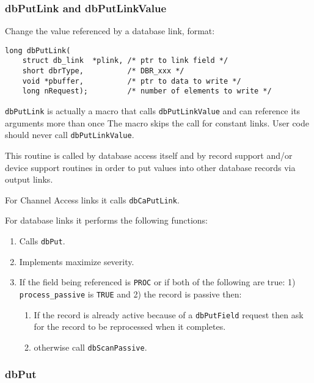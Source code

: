\subsubsection{dbPutLink and dbPutLinkValue}

Change the value referenced by a database link, format:

\begin{verbatim}long dbPutLink(
    struct db_link  *plink, /* ptr to link field */
    short dbrType,          /* DBR_xxx */
    void *pbuffer,          /* ptr to data to write */
    long nRequest);         /* number of elements to write */
\end{verbatim}\verb|dbPutLink| is actually a macro that calls \verb|dbPutLinkValue| and can reference its arguments more than once The 
macro skips the call for constant links. User code should never call \verb|dbPutLinkValue|.

This routine is called by database access itself and by record support and/or device support routines in order to put values 
into other database records via output links.

For Channel Access links it calls \verb|dbCaPutLink|.

For database links it performs the following functions:

\begin{enumerate}\item Calls \verb|dbPut|.

\item Implements maximize severity.

\item If the field being referenced is \verb|PROC| or if both of the following are true: 1) \verb|process_passive| is \verb|TRUE| and 2) the record is passive then:

\begin{enumerate}

\item If the record is already active because of a \verb|dbPutField| request then ask for the record to be reprocessed when it completes.

\item otherwise call \verb|dbScanPassive|.

\end{enumerate}
\end{enumerate}

\subsubsection{dbPut}

